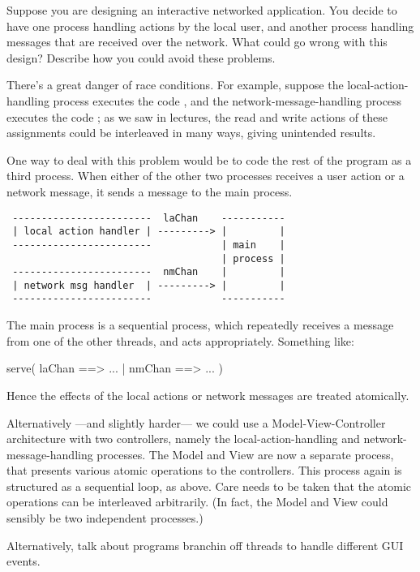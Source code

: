 \begin{question}
Suppose you are designing an interactive networked application.  You decide to
have one process handling actions by the local user, and another process
handling messages that are received over the network.  What could go wrong
with this design?  Describe how you could avoid these problems.
\end{question}

\begin{answer}
There's a great danger of race conditions.  For example, suppose the
local-action-handling process executes the code , and the
network-message-handling process executes the code ; as we saw
in lectures, the read and write actions of these assignments could be
interleaved in many ways, giving unintended results.

One way to deal with this problem would be to code the rest of the program as
a third process.  When either of the other two processes receives a user
action or a network message, it sends a message to the main process.  

\begin{verbatim}
 ------------------------  laChan    -----------
 | local action handler | ---------> |         |
 ------------------------            | main    |
                                     | process |
 ------------------------  nmChan    |         |
 | network msg handler  | ---------> |         |
 ------------------------            -----------
\end{verbatim}

The main process is a sequential process, which repeatedly receives a message
from one of the other threads, and acts appropriately.  Something like:
%
\begin{scala}
serve( laChan ==> { ... }
     | nmChan ==> { ... }
)
\end{scala}
%
Hence the effects of the local actions or network messages are treated
atomically.

Alternatively ---and slightly harder--- we could use a Model-View-Controller
architecture with two controllers, namely the local-action-handling and
network-message-handling processes.  The Model and View are now a separate
process, that presents various atomic operations to the controllers.  This
process again is structured as a sequential  loop, as above.
Care needs to be taken that the atomic operations can be interleaved
arbitrarily. (In fact, the Model and View could sensibly be two independent
processes.)
\end{answer}



Alternatively, talk about programs branchin off threads to handle different
GUI events.

